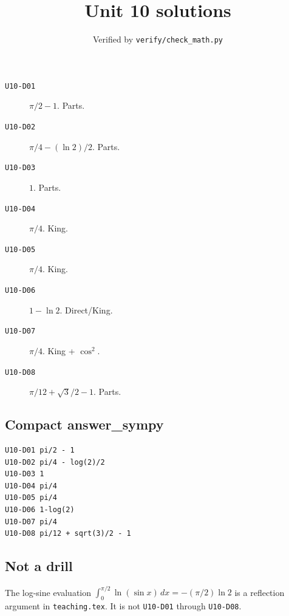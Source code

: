 
\title{Unit 10 solutions}
\author{Verified by \texttt{verify/check\_math.py}}

\maketitle
\begin{description}
\item[\texttt{U10-D01}] \(\pi/2-1\). Parts.
\item[\texttt{U10-D02}] \(\pi/4-(\ln 2)/2\). Parts.
\item[\texttt{U10-D03}] \(1\). Parts.
\item[\texttt{U10-D04}] \(\pi/4\). King.
\item[\texttt{U10-D05}] \(\pi/4\). King.
\item[\texttt{U10-D06}] \(1-\ln 2\). Direct/King.
\item[\texttt{U10-D07}] \(\pi/4\). King + \(\cos^2\).
\item[\texttt{U10-D08}] \(\pi/12+\sqrt{3}/2-1\). Parts.
\end{description}
\subsection*{Compact answer\_sympy}
\begin{verbatim}
U10-D01 pi/2 - 1
U10-D02 pi/4 - log(2)/2
U10-D03 1
U10-D04 pi/4
U10-D05 pi/4
U10-D06 1-log(2)
U10-D07 pi/4
U10-D08 pi/12 + sqrt(3)/2 - 1
\end{verbatim}
\subsection*{Not a drill}
The log-sine evaluation $\int_0^{\pi/2}\ln(\sin x)\,dx=-(\pi/2)\ln 2$ is a reflection argument in \texttt{teaching.tex}. It is not \texttt{U10-D01} through \texttt{U10-D08}.

